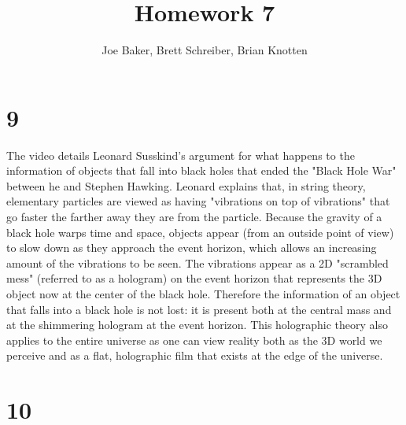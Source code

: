 \documentclass[letterpaper,notitlepage,twoside]{article}
\begin{document}
\title{Homework 7}
\author{Joe Baker, Brett Schreiber, Brian Knotten}
\maketitle

\section*{9}
The video details Leonard Susskind's argument for what happens to the information of objects that fall into black holes that ended the "Black Hole War" between he and Stephen Hawking. Leonard explains that, in string theory, elementary particles are viewed as having "vibrations on top of vibrations" that go faster the farther away they are from the particle. Because the gravity of a black hole warps time and space, objects appear (from an outside point of view) to slow down as they approach the event horizon, which allows an increasing amount of the vibrations to be seen. The vibrations appear as a 2D "scrambled mess" (referred to as a hologram) on the event horizon that represents the 3D object now at the center of the black hole. Therefore the information of an object that falls into a black hole is not lost: it is present both at the central mass and at the shimmering hologram at the event horizon. This holographic theory also applies to the entire universe as one can view reality both as the 3D world we perceive and as a flat, holographic film that exists at the edge of the universe.

\section*{10}
\end{document}
